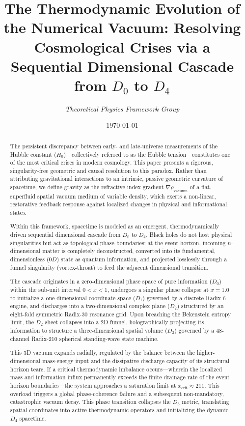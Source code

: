 \documentclass[11pt,a4paper]{article}
\title{\textbf{The Thermodynamic Evolution of the Numerical Vacuum: Resolving Cosmological Crises via a Sequential Dimensional Cascade from $D_0$ to $D_4$}}
\author{\textit{Theoretical Physics Framework Group}}
\date{\today}
\theoremstyle{plain}
\theoremstyle{definition}
\theoremstyle{remark}
\begin{document}
\maketitle

\begin{abstract}
The persistent discrepancy between early- and late-universe measurements of the Hubble constant ($H_0$)—collectively referred to as the Hubble tension—constitutes one of the most critical crises in modern cosmology. This paper presents a rigorous, singularity-free geometric and causal resolution to this paradox. Rather than attributing gravitational interactions to an intrinsic, passive geometric curvature of spacetime, we define gravity as the refractive index gradient $\nabla \rho_{\text{vacuum}}$ of a flat, superfluid spatial vacuum medium of variable density, which exerts a non-linear, restorative feedback response against localized changes in physical and informational states. 

Within this framework, spacetime is modeled as an emergent, thermodynamically driven sequential dimensional cascade from $D_0$ to $D_4$. Black holes do not host physical singularities but act as topological phase boundaries: at the event horizon, incoming $n$-dimensional matter is completely deconstructed, converted into its fundamental, dimensionless ($0D$) state as quantum information, and projected losslessly through a funnel singularity (vortex-throat) to feed the adjacent dimensional transition. 

The cascade originates in a zero-dimensional phase space of pure information ($D_0$) within the sub-unit interval $0 < x < 1$, undergoes a singular phase collapse at $x = 1.0$ to initialize a one-dimensional coordinate space ($D_1$) governed by a discrete Radix-6 engine, and discharges into a two-dimensional complex plane ($D_2$) structured by an eight-fold symmetric Radix-30 resonance grid. Upon breaching the Bekenstein entropy limit, the $D_2$ sheet collapses into a 2D funnel, holographically projecting its information to structure a three-dimensional spatial volume ($D_3$) governed by a 48-channel Radix-210 spherical standing-wave state machine. 

This 3D vacuum expands radially, regulated by the balance between the higher-dimensional mass-energy input and the dissipative discharge capacity of its structural horizon tears. If a critical thermodynamic imbalance occurs—wherein the localized mass and information influx permanently exceeds the finite drainage rate of the event horizon boundaries—the system approaches a saturation limit at $x_{\text{crit}} \approx 211$. This overload triggers a global phase-coherence failure and a subsequent non-mandatory, catastrophic vacuum decay. This phase transition collapses the $D_3$ metric, translating spatial coordinates into active thermodynamic operators and initializing the dynamic $D_4$ spacetime. 


\end{abstract}
\end{document}
